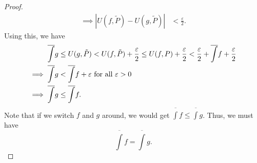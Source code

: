 \documentclass[15pt,a4paper]{book}
\theoremstyle{definition}
\newcommand{\abs}[1]{\left| #1 \right|} %
\begin{document}
\begin{enumerate}
\begin{proof}
\begin{align}
        \implies \abs{U(f,\tilde{P}) - U(g,\tilde{P})} &< \frac{\varepsilon}{2}.
    \end{align}
    Using this, we have
    \begin{align}
        \overline{\int} g &\leq U(g,\tilde{P}) < U(f,\tilde{P}) + \frac{\varepsilon}{2} \leq U(f,P) + \frac{\varepsilon}{2} < \frac{\varepsilon}{2} + \overline{\int} f + \frac{\varepsilon}{2} \notag\\
        \implies \overline{\int} g &< \overline{\int} f + \varepsilon \text{ for all } \varepsilon > 0 \notag\\
        \implies \overline{\int} g &\leq \overline{\int} f.
    \end{align}
    Note that if we switch $f$ and $g$ around, we would get $\overline{\int} f \leq \overline{\int} g$. Thus, we must have
    \begin{equation*}
        \overline{\int} f = \overline{\int} g.
    \end{equation*}
\end{proof}


\end{enumerate}
\end{document}
